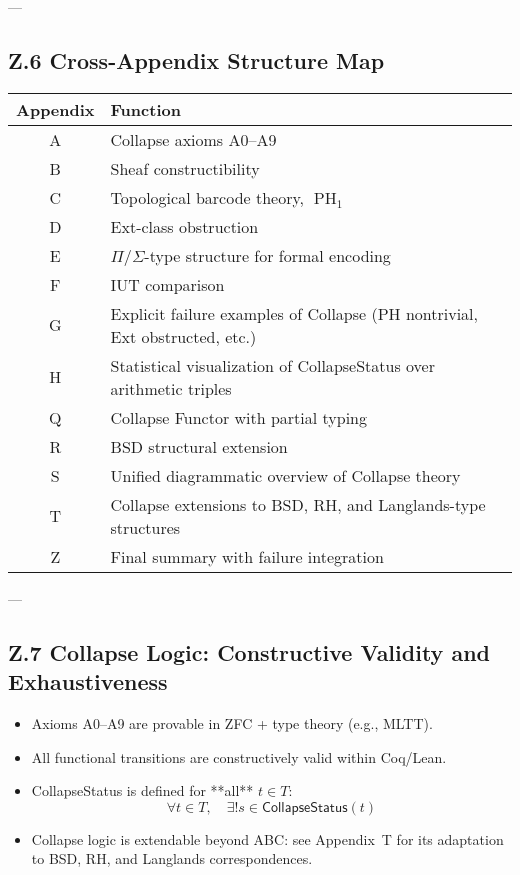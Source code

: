 \documentclass[11pt]{article}
\DeclareMathOperator{\PH}{PH}
\begin{document}
---

\subsection*{Z.6 Cross-Appendix Structure Map}

\begin{center}
\begin{tabular}{|c|p{10cm}|}
\hline
\textbf{Appendix} & \textbf{Function} \\
\hline
A & Collapse axioms A0--A9 \\
\hline
B & Sheaf constructibility \\
\hline
C & Topological barcode theory, \( \PH_1 \) \\
\hline
D & Ext-class obstruction \\
\hline
E & \( \Pi/\Sigma \)-type structure for formal encoding \\
\hline
F & IUT comparison \\
\hline
G & Explicit failure examples of Collapse (PH nontrivial, Ext obstructed, etc.) \\
\hline
H & Statistical visualization of CollapseStatus over arithmetic triples \\
\hline
Q & Collapse Functor with partial typing \\
\hline
R & BSD structural extension \\
\hline
S & Unified diagrammatic overview of Collapse theory \\
\hline
T & Collapse extensions to BSD, RH, and Langlands-type structures \\
\hline
Z & Final summary with failure integration \\
\hline
\end{tabular}
\end{center}

---

\subsection*{Z.7 Collapse Logic: Constructive Validity and Exhaustiveness}

\begin{itemize}
  \item Axioms A0--A9 are provable in ZFC + type theory (e.g., MLTT).
  \item All functional transitions are constructively valid within Coq/Lean.
  \item CollapseStatus is defined for **all** \( t \in T \):  
  \[
  \forall t \in T,\quad \exists! s \in \mathsf{CollapseStatus}(t)
  \]
  \item Collapse logic is extendable beyond ABC: see Appendix~T for its adaptation to BSD, RH, and Langlands correspondences.
\end{itemize}
\end{document}
